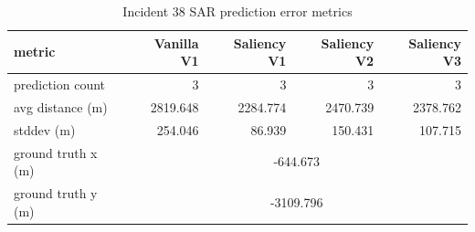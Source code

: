 \begin{table}[ht]
\centering
\caption{Incident 38 SAR prediction error metrics}
\label{tab:sar-incident-38}
\begin{tabular}{lrrrr}
\hline
metric & Vanilla V1 & Saliency V1 & Saliency V2 & Saliency V3 \\
\hline
prediction count & 3 & 3 & 3 & 3 \\
avg distance (m) & 2819.648 & 2284.774 & 2470.739 & 2378.762 \\
stddev (m) & 254.046 & 86.939 & 150.431 & 107.715 \\
ground truth x (m) & \multicolumn{4}{c}{-644.673} \\
ground truth y (m) & \multicolumn{4}{c}{-3109.796} \\
\hline
\end{tabular}
\end{table}
